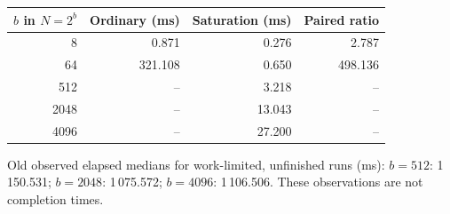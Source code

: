 \begingroup
\small
\setlength{\tabcolsep}{5pt}
\renewcommand{\arraystretch}{1.12}
\begin{tabular}{@{}rrrr@{}}
\toprule
$b$ in $N=2^b$ & Ordinary (ms) & Saturation (ms) & Paired ratio \\
\midrule
8 & 0.871 & 0.276 & 2.787 \\
64 & 321.108 & 0.650 & 498.136 \\
512 & -- & 3.218 & -- \\
2048 & -- & 13.043 & -- \\
4096 & -- & 27.200 & -- \\
\bottomrule
\end{tabular}
\par\smallskip
\begin{minipage}{0.96\linewidth}
\footnotesize Old observed elapsed medians for work-limited, unfinished runs (ms): $b=512$: 1\,150.531; $b=2048$: 1\,075.572; $b=4096$: 1\,106.506. These observations are not completion times.
\end{minipage}
\endgroup
